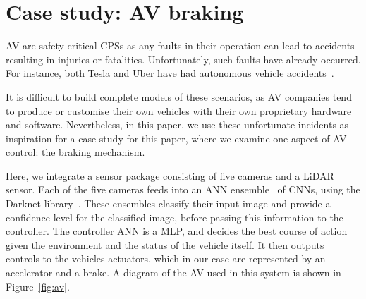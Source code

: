 \section{Case study: \acf{AV} braking}
\label{sec:case}

\ac{AV} are safety critical \acfp{CPS} as any faults in their operation can lead to accidents resulting in injuries or fatalities. 
Unfortunately, such faults have already occurred.
For instance, both Tesla and Uber have had autonomous vehicle accidents~\cite{stewart_2018,coldewey_2018}.

It is difficult to build complete models of these scenarios, as \ac{AV} companies tend to produce or customise their own vehicles with their own proprietary hardware and software.
Nevertheless, in this paper, we use these unfortunate incidents as inspiration for a case study for this paper, where we examine one aspect of \ac{AV} control: the braking mechanism.

Here, we integrate a sensor package consisting of five cameras and a \ac{LiDAR} sensor. 
Each of the five cameras feeds into an \ac{ANN} ensemble~\cite{Maqsood2004} of CNNs, using the Darknet library~\cite{darknet13}.
These ensembles classify their input image and provide a confidence level for the classified image, before passing this information to the controller.
The controller \ac{ANN} is a \ac{MLP}, and decides the best course of action given the environment and the status of the vehicle itself. 
It then outputs controls to the vehicles actuators, which in our case are represented by an accelerator and a brake.
A diagram of the \ac{AV} used in this system is shown in Figure~\ref{fig:av}. 

